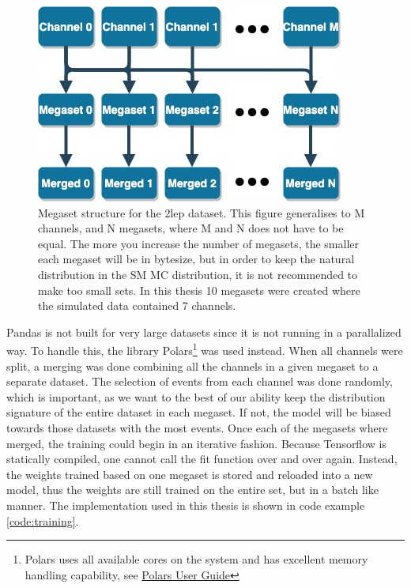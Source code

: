 \begin{figure}[h!]
    \centering
    \includegraphics[width=0.6\linewidth]{Figures/2lep_config/megaset_struct.jpeg}
    \caption[Megaset structure diagram]{Megaset structure for the 2lep dataset. This figure generalises to M channels, and N megasets, 
    where M and N does not have to be equal. The more you increase the number of megasets, 
    the smaller each megaset will be in bytesize, but in order to keep the natural distribution in the SM MC distribution, it is not recommended to make too small sets. 
    In this thesis 10 megasets were created where the simulated data contained 7 channels. }
    \label{fig:2lep_struct}
\end{figure}

Pandas is not built for very large datasets since it is not running in a parallalized way. To handle this, the library
Polars\footnote{Polars uses all available cores on the system and has excellent memory 
handling capability, see \href{https://pola-rs.github.io/polars-book/user-guide/}{Polars User Guide}}
\cite{ritchie_vink_2023_7744139} was used instead. When all channels were split, a merging was done combining all the channels in a given 
megaset to a separate dataset. The selection of events from each channel was done randomly, 
which is important, as we want to the best of our ability keep the distribution signature of the entire dataset in each megaset. If not, the model will 
be biased towards those datasets with the most events. Once each of the megasets where merged, the training could begin in an iterative fashion. Because
Tensorflow is statically compiled, one cannot call the fit function over and over again. Instead, the weights trained based on one megaset is stored and 
reloaded into a new model, thus the weights are still trained on the entire set, but in a batch like manner. 
The implementation used in this thesis is shown in code example \ref{code:training}.



